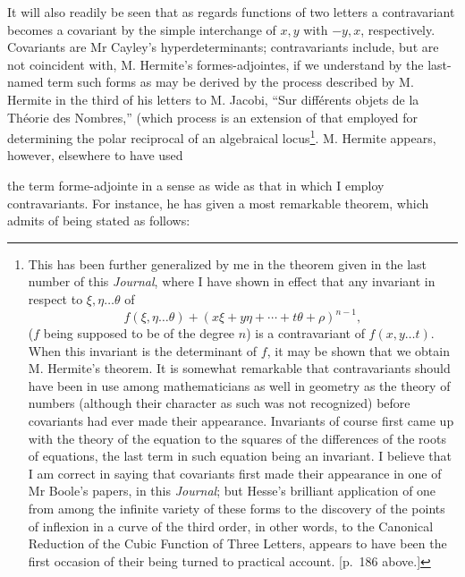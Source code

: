 \documentclass[11pt]{article}
\newcommand{\sourcepage}[1]{\marginpar{\scriptsize p.~#1}}
\begin{document}
{{It will also readily be seen that as regards functions of two letters a contravariant becomes a covariant by the simple interchange of $x,y$ with $-y,x$, respectively. Covariants are Mr Cayley's hyperdeterminants; contravariants include, but are not coincident with, M. Hermite's formes-adjointes, if we understand by the last-named term such forms as may be derived by the process described by M. Hermite in the third of his letters to M. Jacobi, ``Sur diff\'erents objets de la Th\'eorie des Nombres,'' (which process is an extension of that employed for determining the polar reciprocal of an algebraical locus\footnote{This has been further generalized by me in the theorem given in the last number of this \emph{Journal}, where I have shown in effect that any invariant in respect to $\xi,\eta\ldots\theta$ of
\[
 f(\xi,\eta\ldots\theta)+(x\xi+y\eta+\cdots+t\theta+\rho)^{n-1},
\]
($f$ being supposed to be of the degree $n$) is a contravariant of $f(x,y\ldots t)$. When this invariant is the determinant of $f$, it may be shown that we obtain M. Hermite's theorem. It is somewhat remarkable that contravariants should have been in use among mathematicians as well in geometry as the theory of numbers (although their character as such was not recognized) before covariants had ever made their appearance. Invariants of course first came up with the theory of the equation to the squares of the differences of the roots of equations, the last term in such equation being an invariant. I believe that I am correct in saying that covariants first made their appearance in one of Mr Boole's papers, in this \emph{Journal}; but Hesse's brilliant application of one from among the infinite variety of these forms to the discovery of the points of inflexion in a curve of the third order, in other words, to the Canonical Reduction of the Cubic Function of Three Letters, appears to have been the first occasion of their being turned to practical account. [p.~186 above.]}. M. Hermite appears, however, elsewhere to have used

\sourcepage{201}
the term forme-adjointe in a sense as wide as that in which I employ contravariants. For instance, he has given a most remarkable theorem, which admits of being stated as follows:

}}
\end{document}

